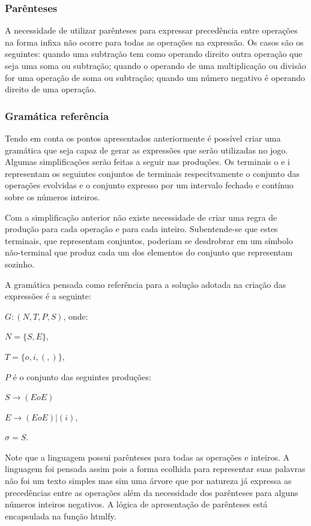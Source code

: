 \subsubsection{Parênteses}
A necessidade de utilizar parênteses para expressar precedência entre operações na forma infixa não ocorre para todas as operações na expressão. Os casos são os seguintes: quando uma subtração tem como operando direito outra operação que seja uma soma ou subtração; quando o operando de uma multiplicação ou divisão for uma operação de soma ou subtração; quando um número negativo é operando direito de uma operação.

\subsubsection{Gramática referência}
Tendo em conta os pontos apresentados anteriormente é possível criar uma gramática que seja capaz de gerar as expressões que serão utilizadas no jogo. Algumas simplificações serão feitas a seguir nas produções. Os terminais o e i representam os seguintes conjuntos de terminais respecitvamente o conjunto das operações evolvidas e o conjunto expresso por um intervalo fechado  e contínuo sobre os números inteiros.

	Com a simplificação anterior não existe necessidade de criar uma regra de produção para cada operação e para cada inteiro. Subentende-se que estes terminais, que representam conjuntos, poderiam se desdrobrar em um símbolo não-terminal que produz cada um dos elementos do conjunto que representam sozinho.
	
	A gramática pensada como referência para a solução adotada na criação das expressões é a seguinte:
	
$G: (N, T, P, S)$, onde:

$N = \{S,E\}$,

$T = \{o,i,(,)\}$,

$P$ é o conjunto das seguintes produções:

$S \to (EoE)$

$E \to (EoE) | (i)$,

$\sigma = S$.

Note que a linguagem possui parênteses para todas as operações e inteiros. A linguagem foi pensada assim pois a forma ecolhida para representar suas palavras não foi um texto simples mas sim uma árvore que por natureza já expressa as precedências entre as operações além da necessidade dos parênteses para alguns números inteiros negativos. A lógica de apresentação de parênteses está encapsulada na função htmlfy.

